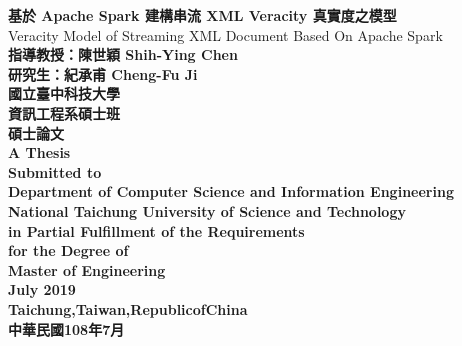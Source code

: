 \documentclass[12pt, a4paper]{article}
\begin{document}
\begin{center}
{\fontsize{16}{20} \textbf{基於 Apache Spark 建構串流 XML Veracity 真實度之模型}}\\
\vspace{14pt}
{\fontsize{16}{20} \textmd{Veracity Model of Streaming XML Document Based On Apache Spark}}\\
\vspace{14pt}
{\fontsize{16}{20} 
\textbf{指導教授：陳世穎 Shih-Ying Chen}\\
\vspace{10pt}
\hspace{12pt}\textbf{研究生：紀承甫 Cheng-Fu Ji}\\
}
\vspace{72pt}
{\fontsize{16}{20}
\textbf{國立臺中科技大學}\\
\vspace{5pt}
\textbf{資訊工程系碩士班}\\
\vspace{5pt}
\textbf{碩士論文}}\\
\vspace{48pt}
\textbf{{\fontsize{16}{20}
A Thesis\\\vspace{5pt}
Submitted to\\\vspace{5pt}
Department of Computer Science and Information Engineering\\\vspace{5pt}
National Taichung University of Science and Technology\\\vspace{5pt}
in Partial Fulfillment of the Requirements\\\vspace{5pt}
for the Degree of\\\vspace{5pt}
Master of Engineering\\
\vspace{60pt}
July 2019\\\vspace{8pt}
Taichung,\hspace{0.5em}Taiwan,\hspace{0.5em}Republic\hspace{0.5em}of\hspace{0.5em}China\\\vspace{10pt}
}}
{\fontsize{17}{21} \textbf{中華民國108年7月}}

\end{center}
\end{document}
